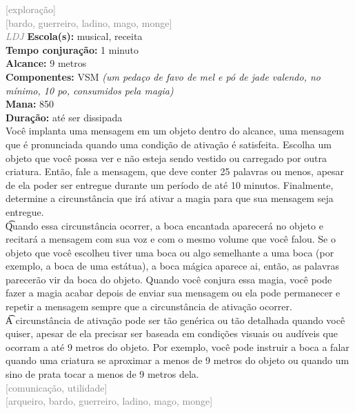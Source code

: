 \documentclass{RPG_Adventure}[2021/10/20]
\begin{document}
{\scriptsize \textcolor{gray}{[exploração]\\}}
{\scriptsize \textcolor{gray}{[bardo, guerreiro, ladino, mago, monge]\\}}
{\tiny \textcolor{gray}{\textit{LDJ}}}\jump{}
{\small \t \textbf{Escola(s):} musical, receita\\\t \textbf{Tempo conjuração:} 1 minuto\\\t \textbf{Alcance:} 9 metros\\\t \textbf{Componentes:} VSM \textit{(um pedaço de favo de mel e pó de jade valendo, no mínimo, 10 po, consumidos pela magia)}\\\t \textbf{Mana:} 850\\\t \textbf{Duração:} até ser dissipada\\}
{\normalsize Você implanta uma mensagem em um objeto dentro do alcance, uma mensagem que é pronunciada quando uma condição de ativação é satisfeita. Escolha um objeto que você possa ver e não esteja sendo vestido ou carregado por outra criatura. Então, fale a mensagem, que deve conter 25 palavras ou menos, apesar de ela poder ser entregue durante um período de até 10 minutos. Finalmente, determine a circunstância que irá ativar a magia para que sua mensagem seja entregue.\\\t Quando essa circunstância ocorrer, a boca encantada aparecerá no objeto e recitará a mensagem com sua voz e com o mesmo volume que você falou. Se o objeto que você escolheu tiver uma boca ou algo semelhante a uma boca (por exemplo, a boca de uma estátua), a boca mágica aparece ai, então, as palavras parecerão vir da boca do objeto. Quando você conjura essa magia, você pode fazer a magia acabar depois de enviar sua mensagem ou ela pode permanecer e repetir a mensagem sempre que a circunstância de ativação ocorrer.\\\t A circunstância de ativação pode ser tão genérica ou tão detalhada quando você quiser, apesar de ela precisar ser baseada em condições visuais ou audíveis que ocorram a até 9 metros do objeto. Por exemplo, você pode instruir a boca a falar quando uma criatura se aproximar a menos de 9 metros do objeto ou quando um sino de prata tocar a menos de 9 metros dela.\\}
{\scriptsize \textcolor{gray}{[comunicação, utilidade]\\}}
{\scriptsize \textcolor{gray}{[arqueiro, bardo, guerreiro, ladino, mago, monge]\\}}
\end{document}

